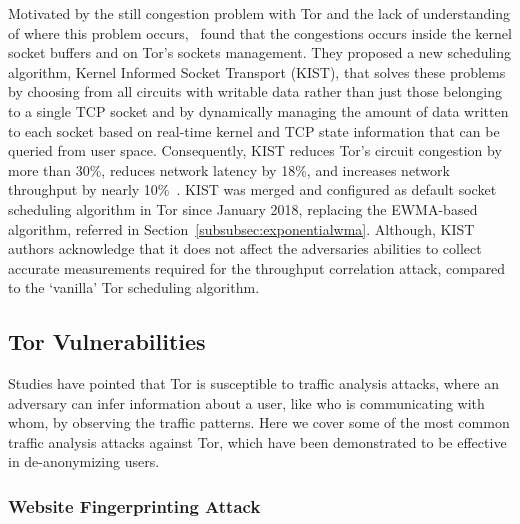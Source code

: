 Motivated by the still congestion problem with Tor and the lack of understanding of where this problem occurs,~\citeauthor{KIST} found that the congestions occurs inside the kernel socket buffers and on Tor's sockets management. They proposed a new scheduling algorithm, Kernel Informed Socket Transport (KIST), that solves these problems by choosing from all circuits with writable data rather than just those belonging to a single TCP socket and by dynamically managing the amount of data written to each socket based on real-time kernel and TCP state information that can be queried from user space. Consequently, KIST reduces Tor's circuit congestion by more than 30\%, reduces network latency by 18\%, and increases network throughput by nearly 10\%~\cite{KIST}. 
KIST was merged and configured as default socket scheduling algorithm in Tor since January 2018, replacing the EWMA-based algorithm, referred in Section~\ref{subsubsec:exponentialwma}. Although, KIST authors acknowledge that it does not affect the adversaries abilities to collect accurate measurements required for the throughput correlation attack, compared to the `vanilla' Tor scheduling algorithm.

\subsection{Tor Vulnerabilities}\label{subsec:tor_vulnerabilities}

Studies have pointed that Tor is susceptible to traffic analysis attacks, where an adversary can infer information about a user, like who is communicating with whom, by observing the traffic patterns. Here we cover some of the most common traffic analysis attacks against Tor, which have been demonstrated to be effective in de-anonymizing users.

\subsubsection{Website Fingerprinting Attack}\label{subsubsec:website_fingerprinting_attack}

